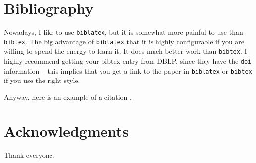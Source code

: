 \documentclass[12pt]{article}
\begin{document}
\section{Bibliography}

Nowadays, I like to use \texttt{biblatex}, but it is somewhat more
painful to use than \texttt{bibtex}. The big advantage of
\texttt{biblatex} that it is highly configurable if you are willing to
spend the energy to learn it. It does much better work than
\texttt{bibtex}. I highly recommend getting your bibtex entry from
DBLP, since they have the \texttt{doi} information -- this implies
that you get a link to the paper in \texttt{biblatex} or
\texttt{bibtex} if you use the right style.

Anyway, here is an example of a citation \cite{k-spda-10}.






\section*{Acknowledgments}

Thank everyone.


\BibTexMode{%
   
   
}%
\BibLatexMode{\printbibliography}
\end{document}
